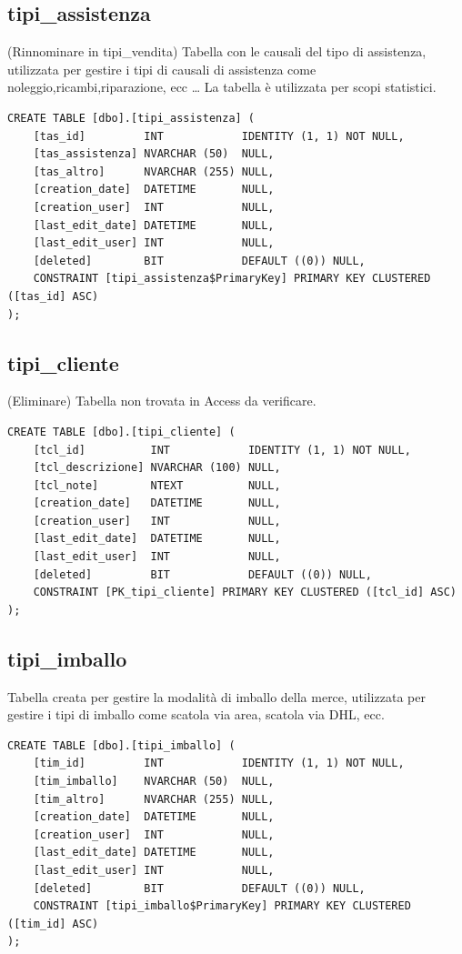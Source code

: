\documentclass[12pt]{article}
\begin{document}
\subsection{tipi\_assistenza}(Rinnominare in  tipi\_vendita)
Tabella con le causali del tipo di assistenza,
utilizzata per gestire i tipi di causali di assistenza come noleggio,ricambi,riparazione, ecc \dots
La tabella è utilizzata per scopi statistici.
\begin{lstlisting}
CREATE TABLE [dbo].[tipi_assistenza] (
    [tas_id]         INT            IDENTITY (1, 1) NOT NULL,
    [tas_assistenza] NVARCHAR (50)  NULL,
    [tas_altro]      NVARCHAR (255) NULL,
    [creation_date]  DATETIME       NULL,
    [creation_user]  INT            NULL,
    [last_edit_date] DATETIME       NULL,
    [last_edit_user] INT            NULL,
    [deleted]        BIT            DEFAULT ((0)) NULL,
    CONSTRAINT [tipi_assistenza$PrimaryKey] PRIMARY KEY CLUSTERED ([tas_id] ASC)
);
\end{lstlisting}

\subsection{tipi\_cliente} (Eliminare)
Tabella non trovata in Access da verificare.
\begin{lstlisting}
CREATE TABLE [dbo].[tipi_cliente] (
    [tcl_id]          INT            IDENTITY (1, 1) NOT NULL,
    [tcl_descrizione] NVARCHAR (100) NULL,
    [tcl_note]        NTEXT          NULL,
    [creation_date]   DATETIME       NULL,
    [creation_user]   INT            NULL,
    [last_edit_date]  DATETIME       NULL,
    [last_edit_user]  INT            NULL,
    [deleted]         BIT            DEFAULT ((0)) NULL,
    CONSTRAINT [PK_tipi_cliente] PRIMARY KEY CLUSTERED ([tcl_id] ASC)
);
\end{lstlisting}

\subsection{tipi\_imballo}
Tabella creata per gestire la modalità di imballo della merce,
utilizzata per gestire i tipi di imballo come scatola via area, scatola via DHL, ecc.
\begin{lstlisting}
CREATE TABLE [dbo].[tipi_imballo] (
    [tim_id]         INT            IDENTITY (1, 1) NOT NULL,
    [tim_imballo]    NVARCHAR (50)  NULL,
    [tim_altro]      NVARCHAR (255) NULL,
    [creation_date]  DATETIME       NULL,
    [creation_user]  INT            NULL,
    [last_edit_date] DATETIME       NULL,
    [last_edit_user] INT            NULL,
    [deleted]        BIT            DEFAULT ((0)) NULL,
    CONSTRAINT [tipi_imballo$PrimaryKey] PRIMARY KEY CLUSTERED ([tim_id] ASC)
);
\end{lstlisting}
\end{document}
